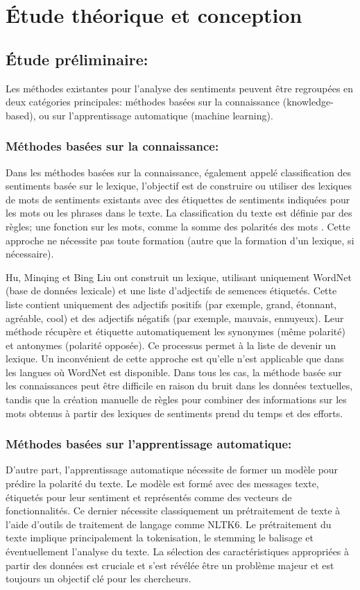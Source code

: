 \chapter{Étude théorique et conception}
\section{Étude préliminaire:}
Les méthodes existantes pour l'analyse des sentiments peuvent être regroupées en deux catégories principales: méthodes basées sur la connaissance (knowledge-based), ou sur l'apprentissage automatique (machine learning).

\subsection{Méthodes basées sur la connaissance: }
Dans les méthodes basées sur la connaissance, également appelé classification des sentiments basée sur le lexique, l'objectif est de
construire ou utiliser des lexiques de mots de sentiments existants avec des étiquettes de sentiments indiquées pour les mots
ou les phrases dans le texte. La classification du texte est définie par des règles; une fonction sur les mots, comme la somme des polarités des mots \cite{taboada2011lexicon}. Cette approche ne nécessite pas
toute formation (autre que la formation d'un lexique, si nécessaire).

Hu, Minqing et Bing Liu \cite{hu2004mining} ont construit un lexique, utilisant uniquement WordNet (base de données lexicale) et une liste d'adjectifs de semences étiquetés. Cette liste contient uniquement des adjectifs positifs (par exemple, grand, étonnant, agréable, cool) et des adjectifs négatifs (par exemple, mauvais, ennuyeux). Leur méthode récupère et étiquette automatiquement les synonymes (même polarité) et antonymes (polarité opposée). Ce processus permet à la liste de devenir un lexique. Un inconvénient de cette approche est qu'elle n'est applicable que dans les langues où WordNet est disponible. Dans tous les cas, la méthode basée sur les connaissances peut être difficile en raison du bruit dans les données textuelles, tandis que la création manuelle de règles pour combiner des informations sur les mots obtenus à partir des lexiques de sentiments prend du temps et des efforts.

\subsection{Méthodes basées sur l'apprentissage automatique: }
D'autre part, l'apprentissage automatique nécessite de former un modèle pour prédire la polarité du texte. Le modèle est formé avec des messages texte, étiquetés pour leur sentiment et représentés comme des vecteurs de fonctionnalités. Ce dernier nécessite classiquement un prétraitement de texte à l'aide d'outils de traitement de langage comme NLTK6. Le prétraitement du texte implique principalement la tokenisation, le stemming le balisage et éventuellement l'analyse du texte. La sélection des caractéristiques appropriées à partir des données est cruciale et s'est révélée être un problème majeur et est toujours un objectif clé pour les chercheurs.

